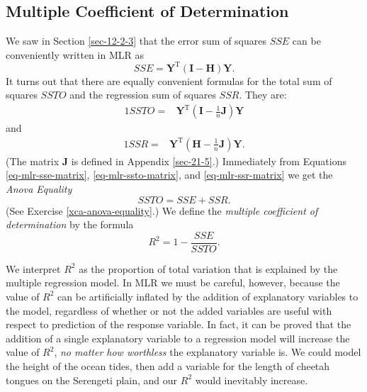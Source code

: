 \subsection{Multiple Coefficient of Determination}
\label{sec-12-3-1}

We saw in Section \ref{sec-12-2-3} that the error sum of squares \(SSE\) can be conveniently written in MLR as 
\begin{equation}
\label{eq-mlr-sse-matrix}
SSE=\mathbf{Y}^{\mathrm{T}}(\mathbf{I}-\mathbf{H})\mathbf{Y}.
\end{equation}
It turns out that there are equally convenient formulas for the total sum of squares \(SSTO\) and the regression sum of squares \(SSR\). They are:
\begin{alignat}{1}
\label{eq-mlr-ssto-matrix}
SSTO= & \mathbf{Y}^{\mathrm{T}}\left(\mathbf{I}-\frac{1}{n}\mathbf{J}\right)\mathbf{Y}
\end{alignat}
and
\begin{alignat}{1}
\label{eq-mlr-ssr-matrix}
SSR= & \mathbf{Y}^{\mathrm{T}}\left(\mathbf{H}-\frac{1}{n}\mathbf{J}\right)\mathbf{Y}.
\end{alignat}
(The matrix \(\mathbf{J}\) is defined in Appendix
\ref{sec-21-5}.) Immediately from Equations
\eqref{eq-mlr-sse-matrix}, \eqref{eq-mlr-ssto-matrix}, and
\eqref{eq-mlr-ssr-matrix} we get the \emph{Anova Equality}
\begin{equation} 
SSTO=SSE+SSR.
\end{equation}
(See Exercise \ref{xca-anova-equality}.) We define the \emph{multiple coefficient of determination} by the formula
\begin{equation} 
R^{2}=1-\frac{SSE}{SSTO}.
\end{equation}

We interpret \(R^{2}\) as the proportion of total variation that is
explained by the multiple regression model. In MLR we must be careful,
however, because the value of \(R^{2}\) can be artificially inflated
by the addition of explanatory variables to the model, regardless of
whether or not the added variables are useful with respect to
prediction of the response variable. In fact, it can be proved that
the addition of a single explanatory variable to a regression model
will increase the value of \(R^{2}\), \emph{no matter how worthless} the
explanatory variable is. We could model the height of the ocean tides,
then add a variable for the length of cheetah tongues on the Serengeti
plain, and our \(R^{2}\) would inevitably increase.

